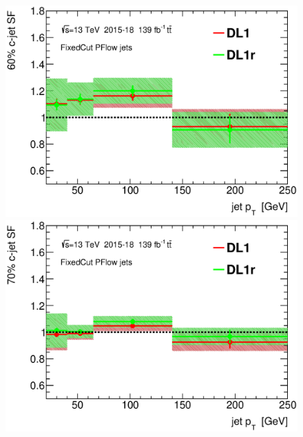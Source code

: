 \documentclass[letterpaper,12pt]{article}
\begin{document}
\iffalse
\begin{figure}[H]
\begin{minipage}[b]{.45\textwidth}
\centering
\includegraphics[width=1\textwidth]{SFplots_december/DL1allPFlowDec_DL1rallPFlowDec/SF60.eps}
\end{minipage}\hfill
\begin{minipage}[b]{.45\textwidth}
\centering
\includegraphics[width=1\textwidth]{SFplots_december/DL1allPFlowDec_DL1rallPFlowDec/SF70.eps}
\end{minipage}\hfill
\begin{minipage}[b]{.45\textwidth}
\centering

\end{minipage}
\end{figure}
\end{document}
